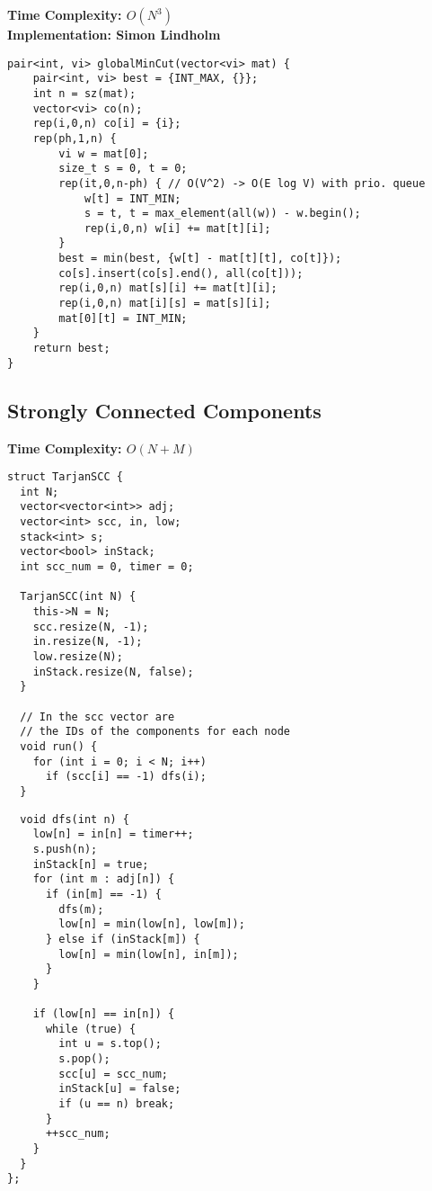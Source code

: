 \textbf{Time Complexity: $O(N^3)$}\\
\textbf{Implementation: Simon Lindholm}

\begin{lstlisting}
pair<int, vi> globalMinCut(vector<vi> mat) {
	pair<int, vi> best = {INT_MAX, {}};
	int n = sz(mat);
	vector<vi> co(n);
	rep(i,0,n) co[i] = {i};
	rep(ph,1,n) {
		vi w = mat[0];
		size_t s = 0, t = 0;
		rep(it,0,n-ph) { // O(V^2) -> O(E log V) with prio. queue
			w[t] = INT_MIN;
			s = t, t = max_element(all(w)) - w.begin();
			rep(i,0,n) w[i] += mat[t][i];
		}
		best = min(best, {w[t] - mat[t][t], co[t]});
		co[s].insert(co[s].end(), all(co[t]));
		rep(i,0,n) mat[s][i] += mat[t][i];
		rep(i,0,n) mat[i][s] = mat[s][i];
		mat[0][t] = INT_MIN;
	}
	return best;
}
\end{lstlisting}

\newpage

\subsection{Strongly Connected Components}

\textbf{Time Complexity: $O(N+M)$}\\

\begin{minipage}[t]{0.45\linewidth}
\begin{lstlisting}
struct TarjanSCC {
  int N;
  vector<vector<int>> adj;
  vector<int> scc, in, low;
  stack<int> s;
  vector<bool> inStack;
  int scc_num = 0, timer = 0;
  
  TarjanSCC(int N) {
    this->N = N;
    scc.resize(N, -1);
    in.resize(N, -1);
    low.resize(N);
    inStack.resize(N, false);
  }

  // In the scc vector are
  // the IDs of the components for each node
  void run() {
    for (int i = 0; i < N; i++)
      if (scc[i] == -1) dfs(i);
  }
\end{lstlisting}
\end{minipage}
\qquad
\begin{minipage}[t]{0.45\linewidth}
\begin{lstlisting}
  void dfs(int n) {
    low[n] = in[n] = timer++;
    s.push(n);
    inStack[n] = true;
    for (int m : adj[n]) {
      if (in[m] == -1) {
        dfs(m);
        low[n] = min(low[n], low[m]);
      } else if (inStack[m]) {
        low[n] = min(low[n], in[m]);
      }
    }
    
    if (low[n] == in[n]) {
      while (true) {
        int u = s.top();
        s.pop();
        scc[u] = scc_num;
        inStack[u] = false;
        if (u == n) break;
      }
      ++scc_num;
    }
  }
};
\end{lstlisting}
\end{minipage}

